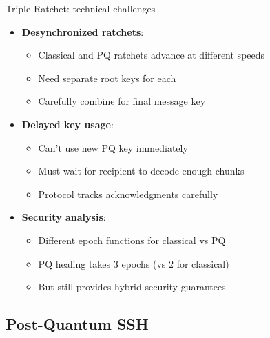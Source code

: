 \ifdefined\PRESENTATION\else\PassOptionsToClass{handout}{beamer}\fi\documentclass[aspectratio=169, lualatex]{beamer}
\begin{document}
\begin{frame}{Triple Ratchet: technical challenges}
	\begin{itemize}
		\item \textbf{Desynchronized ratchets}:
		      \begin{itemize}
			      \item Classical and PQ ratchets advance at different speeds
			      \item Need separate root keys for each
			      \item Carefully combine for final message key
		      \end{itemize}
		\item \textbf{Delayed key usage}:
		      \begin{itemize}
			      \item Can't use new PQ key immediately
			      \item Must wait for recipient to decode enough chunks
			      \item Protocol tracks acknowledgments carefully
		      \end{itemize}
		\item \textbf{Security analysis}:
		      \begin{itemize}
			      \item Different epoch functions for classical vs PQ
			      \item PQ healing takes 3 epochs (vs 2 for classical)
			      \item But still provides hybrid security guarantees
		      \end{itemize}
	\end{itemize}
\end{frame}

\subsection{Post-Quantum SSH}
\end{document}
